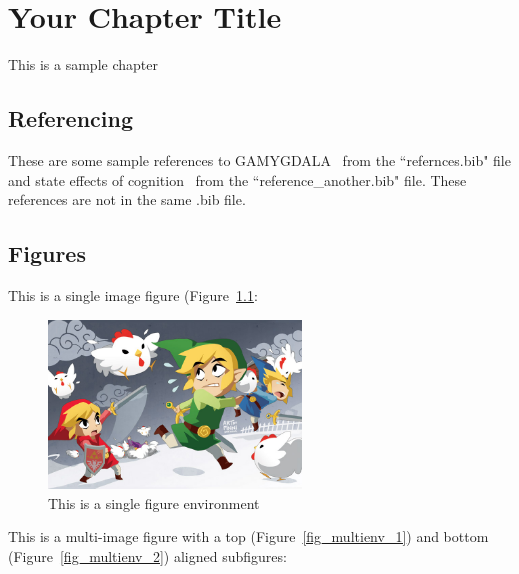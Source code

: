 \chapter{Your Chapter Title}

This is a sample chapter

\section{Referencing}
These are some sample references to GAMYGDALA~\citep{popescu2014gamygdala} from the ``refernces.bib" file and state effects of cognition~\citep{hudlicka2002time} from the ``reference\_another.bib" file. These references are not in the same .bib file.

\section{Figures}
This is a single image figure (Figure~\ref{fig_singleenv}:

\begin{figure}[ht]
	\centering
	\includegraphics[width=0.6\textwidth]{figures/Sample/tumblr_static_eaceks0rfxsss8o4swscw40wo.jpg}
	\caption[Single Figure Environment Listed Title]{This is a single figure environment}
	\label{fig_singleenv}
\end{figure}

This is a multi-image figure with a top (Figure~\ref{fig_multienv_1}) and bottom (Figure~\ref{fig_multienv_2}) aligned subfigures:

